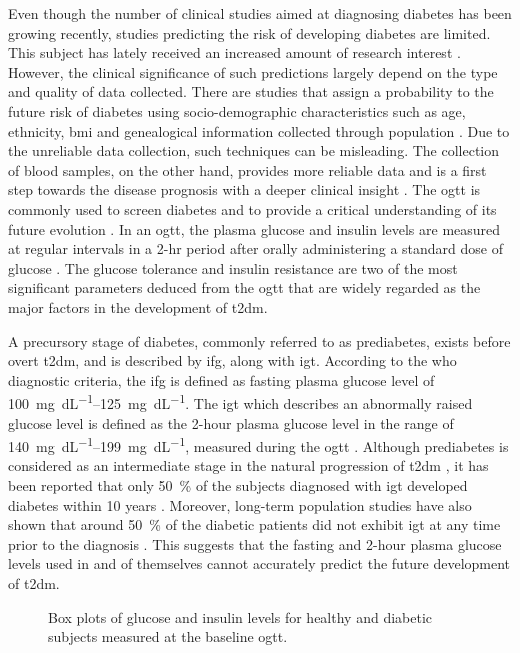 \documentclass[journal,comsoc]{IEEEtran}
\renewcommand{\^}{\hat}  %
\begin{document}
Even though the number of clinical studies aimed at diagnosing diabetes has been growing recently, studies predicting the risk of developing diabetes are limited. This subject has lately received an increased amount of research interest \cite{noble2011risk}. However, the clinical significance of such predictions largely depend on the type and quality of data collected. There are studies that assign a probability to the future risk of diabetes using socio-demographic characteristics such as age, ethnicity, \ac{bmi} and genealogical information collected through population  \cite{Heikes1040, Glumer727}. Due to the unreliable data collection, such techniques can be misleading. The collection of blood samples, on the other hand, provides more reliable data and is a first step towards the disease prognosis with a deeper clinical insight \cite{HELIOVAARA1993181}. The \ac{ogtt} is commonly used to screen diabetes \cite{expert-committee} and to provide a critical understanding of its future evolution \cite{stumvoll_use_2000}. In an \ac{ogtt}, the plasma glucose and insulin levels are measured at regular intervals in a 2-hr period after orally administering a standard dose of glucose \cite{stumvoll_use_2000}. The glucose tolerance and insulin resistance are two of the most significant parameters deduced from the \ac{ogtt} that are widely regarded as the major factors in the development of \ac{t2dm}.

A precursory stage of diabetes, commonly referred to as prediabetes, exists before overt \ac{t2dm}, and is described by \ac{ifg}, along with \ac{igt}. According to the \ac{who} diagnostic criteria, the \ac{ifg} is defined as fasting plasma glucose level of \SIrange[round-mode = off,group-separator = {,}]{100}{125}{\milli\gram\per\deci\liter}. The \ac{igt} which describes an abnormally raised glucose level is defined as the 2-hour plasma glucose level in the range of \SIrange[round-mode = off,group-separator = {,}]{140}{199}{\milli\gram\per\deci\liter}, measured during the \ac{ogtt} \cite{organization_definition_2006}. Although prediabetes is considered as an intermediate stage in the natural progression of \ac{t2dm} \cite{defronzo2011assessment}, it has been reported that only \SI{50}{\percent} of the subjects diagnosed with \ac{igt} developed diabetes within 10 years \cite{shaw_impaired_1999, writing_committee_impaired_2002}. Moreover, long-term population studies have also shown that around \SI{50}{\percent} of the diabetic patients did not exhibit \ac{igt} at any time prior to the diagnosis \cite{abdul-ghani_what_2007}. This suggests that the fasting and 2-hour plasma glucose levels used in and of themselves cannot accurately predict the future development of \ac{t2dm}.
%
\begin{figure}
  \centering
  \caption{Box plots of glucose and insulin levels for healthy and diabetic subjects measured at the baseline \ac{ogtt}.}
  \label{fig:ogtt_mean}
\end{figure}
%
\end{document}
